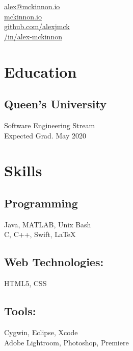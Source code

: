 \documentclass[]{hieudo-build}
\begin{document}
%
%
{
	\faEnvelope \href{mailto:alex@mckinnon.io}{ alex@mckinnon.io}\\
    \faGlobe \href{https://mckinnon.io}{ mckinnon.io}\\
	\faGithub \href{https://github.com/alexjmck}{   github.com/alexjmck}\\
	\faLinkedinSquare \href{https://www.linkedin.com/in/alex-mckinnon}{   /in/alex-mckinnon}
}
    
%
%
\begin{minipage}[t]{0.34\textwidth} 

\section{Education} 

\subsection{Queen's University}
Software Engineering Stream \\
Expected Grad. May 2020 \\
\sectionsep

\section{Skills}
\subsection{Programming}
Java, MATLAB, Unix Bash\\ 
C, C++, Swift, \LaTeX

\subsection{Web Technologies:}
HTML5, CSS \\

\subsection{Tools:}
Cygwin, Eclipse, Xcode\\
Adobe Lightroom, Photoshop, Premiere \\ 


\end{minipage}
\end{document}
